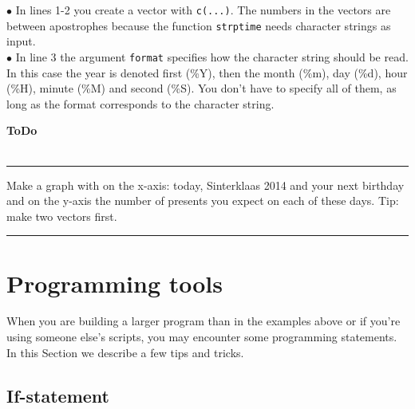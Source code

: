 \documentclass[a4paper,11pt,twocolumn,tablecaptionabove]{scrartcl}
\newenvironment{ToDo} {%
  \begin{flushright}
    \hfill
    \begin{minipage}{0.95\columnwidth}         %
    \textsf{\textbf{ToDo}} \\
      \vspace{-0.85cm}\\
      {\color{Gray}\rule[-0.1cm]{\columnwidth}{1.5pt}}} { %
      {\color{Gray} \rule[0.3cm]{\columnwidth}{1.5pt}}
    \end{minipage}
    \vspace{1em}
  \end{flushright}
  }
\begin{document}
\noindent $\bullet$  In lines 1-2 you create a vector with \texttt{c(...)}. The numbers in the vectors are between apostrophes because the function \texttt{strptime} needs character strings as input.\\
\noindent $\bullet$ In line 3 the argument \texttt{format} specifies how the character string should be read. In this case the year is denoted first (\%Y), then the month (\%m), day (\%d), hour (\%H), minute (\%M) and second (\%S). You don't have to specify all of them, as long as the format corresponds to the character string.

\begin{ToDo}
Make a graph with on the x-axis: today, Sinterklaas 2014 and your next birthday and on the y-axis the number of presents you expect on each of these days. Tip: make two vectors first.
\end{ToDo}





\section{Programming tools}

When you are building a larger program than in the examples above or if you're using someone else's scripts, you may encounter some programming statements. In this Section we describe a few tips and tricks.

\subsection{If-statement}
\end{document}
